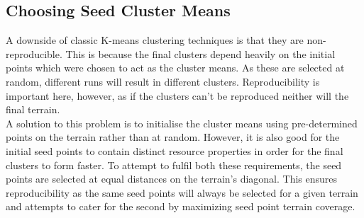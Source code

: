 \subsection{Choosing Seed Cluster Means} \label{subsec:init_clusters}

A downside of classic K-means clustering techniques is that they are non-reproducible. This is because the final clusters depend heavily on the initial points which were chosen to act as the cluster means. As these are selected at random, different runs will result in different clusters. Reproducibility is important here, however, as if the clusters can't be reproduced neither will the final terrain. \\

A solution to this problem is to initialise the cluster means using pre-determined points on the terrain rather than at random. However, it is also good for the initial seed points to contain distinct resource properties in order for the final clusters to form faster. To attempt to fulfil both these requirements, the seed points are selected at equal distances on the terrain's diagonal. This ensures reproducibility as the same seed points will always be selected for a given terrain and attempts to cater for the second by maximizing seed point terrain coverage. 



